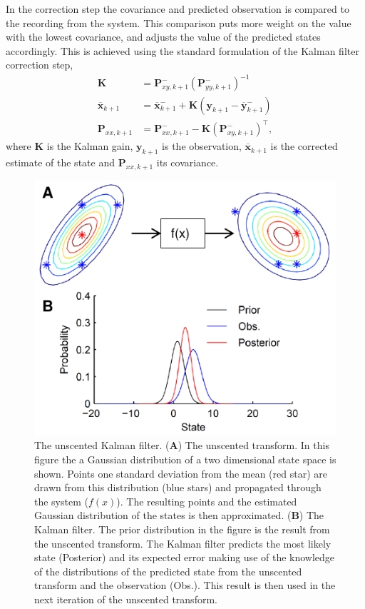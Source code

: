 In the correction step the covariance and predicted observation is compared to the recording from the system. This comparison puts more weight on the value with the lowest covariance, and adjusts the value of the predicted states accordingly. This is achieved using the standard formulation of the Kalman filter correction step,
\begin{align}
\mathbf{K} &= \mathbf{P}_{xy,k+1}^{-}(\mathbf{P}_{yy,k+1}^{-})^{-1}\\
\overline{\mathbf{x}}_{k+1} &= \overline{\mathbf{x}}_{k+1}^{-} + \mathbf{K}(\mathbf{y}_{k+1}-\overline{\mathbf{y}}_{k+1}^{-})\\
\mathbf{P}_{xx,k+1} &= \mathbf{P}_{xx,k+1}^{-} - \mathbf{K}(\mathbf{P}_{xy,k+1}^{-})^{\top},
\end{align} where $\mathbf{K}$ is the Kalman gain, $\mathbf{y}_{k+1}$ is the observation, $\overline{\mathbf{x}}_{k+1}$ is the corrected estimate of the state and $\mathbf{P}_{xx,k+1}$ its covariance.

 \begin{figure}
 	\centering
 		\includegraphics{fig/UnscentedKalman.pdf}
 	\caption{The unscented Kalman filter. (\textbf{A}) The unscented transform. In this figure the a Gaussian distribution of a two dimensional state space is shown. Points one standard deviation  from the mean (red star) are drawn from this distribution (blue stars) and propagated through the system ($f(x)$). The resulting points and the estimated Gaussian distribution of the states is then approximated. (\textbf{B}) The Kalman filter. The prior distribution in the figure is the result from the unscented transform. The Kalman filter predicts the most likely state (Posterior) and its expected error making use of the knowledge of the distributions of the predicted state from the unscented transform and the observation (Obs.). This result is then used in the next iteration of the unscented transform.}
 	\label{fig: UKF}
 \end{figure}



